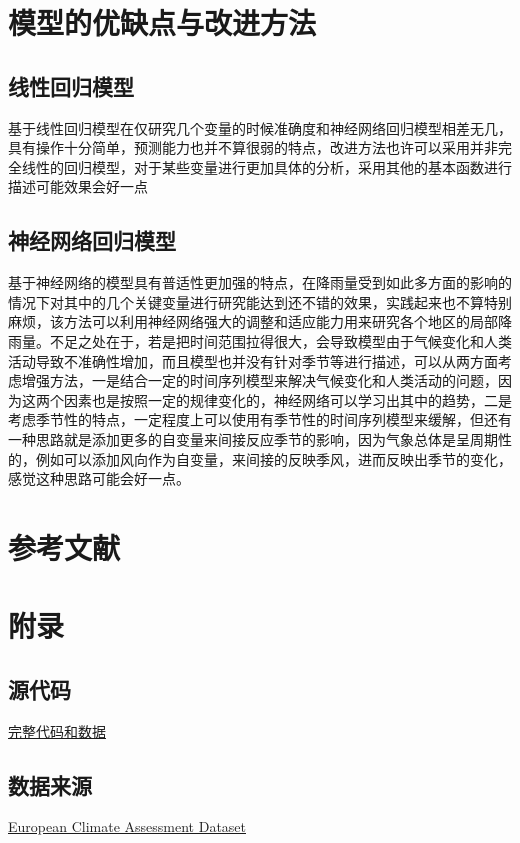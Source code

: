 \documentclass[UTF8, a4paper]{ctexart}
\begin{document}
\section{模型的优缺点与改进方法}

\subsection{线性回归模型}
基于线性回归模型在仅研究几个变量的时候准确度和神经网络回归模型相差无几，具有操作十分简单，预测能力也并不算很弱的特点，改进方法也许可以采用并非完全线性的回归模型，对于某些变量进行更加具体的分析，采用其他的基本函数进行描述可能效果会好一点

\subsection{神经网络回归模型}
基于神经网络的模型具有普适性更加强的特点，在降雨量受到如此多方面的影响的情况下对其中的几个关键变量进行研究能达到还不错的效果，实践起来也不算特别麻烦，该方法可以利用神经网络强大的调整和适应能力用来研究各个地区的局部降雨量。不足之处在于，若是把时间范围拉得很大，会导致模型由于气候变化和人类活动导致不准确性增加，而且模型也并没有针对季节等进行描述，可以从两方面考虑增强方法，一是结合一定的时间序列模型来解决气候变化和人类活动的问题，因为这两个因素也是按照一定的规律变化的，神经网络可以学习出其中的趋势，二是考虑季节性的特点，一定程度上可以使用有季节性的时间序列模型来缓解，但还有一种思路就是添加更多的自变量来间接反应季节的影响，因为气象总体是呈周期性的，例如可以添加风向作为自变量，来间接的反映季风，进而反映出季节的变化，感觉这种思路可能会好一点。

\section{参考文献}


\appendix
\setcounter{secnumdepth}{-2}
\section{附录}

\setcounter{secnumdepth}{3}
\subsection{源代码}

\href{https://github.com/limuy2022/math_model}{完整代码和数据}

\subsection{数据来源}

\href{https://www.ecad.eu/}{European Climate Assessment  Dataset}
\end{document}
